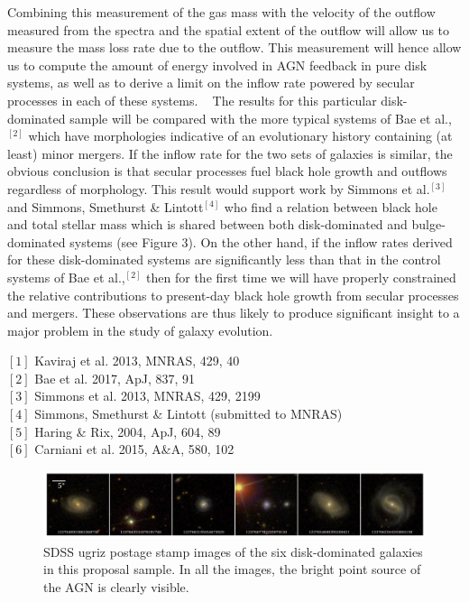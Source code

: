 \documentclass[12pt]{article}
\begin{document}
Combining this measurement of the gas mass with the velocity of the outflow measured from the spectra and the spatial extent of the outflow will allow us to measure the mass loss rate due to the outflow. This measurement will hence allow us to compute the amount of energy involved in AGN feedback in pure disk systems, as well as to derive a limit on the inflow rate powered by secular processes in each of these systems. 
\vspace{0.25em}
 
The results for this particular disk-dominated sample will be compared with the more typical systems of Bae et al.,$^{[2]}$ which have morphologies indicative of an evolutionary history containing (at least) minor mergers. If the inflow rate for the two sets of galaxies is similar, the obvious conclusion is that secular processes fuel black hole growth and outflows regardless of morphology. This result would support work by Simmons et al.$^{[3]}$ and Simmons, Smethurst \& Lintott$^{[4]}$ who find a relation between black hole and total stellar mass which is shared between both disk-dominated and bulge-dominated systems (see Figure 3). On the other hand, if the inflow rates derived for these disk-dominated systems are significantly less than that in the control systems of Bae et al.,$^{[2]}$ then for the first time we will have properly constrained the relative contributions to present-day black hole growth from secular processes and mergers. These observations are thus likely to produce significant insight to a major problem in the study of galaxy evolution. 
\vspace{1.5em}


\vspace{0.5em}


\noindent
$[1]$ Kaviraj et al. 2013, MNRAS, 429, 40
\\
$[2]$ Bae et al. 2017, ApJ, 837, 91
\\
$[3]$ Simmons et al. 2013, MNRAS, 429, 2199 
\\
$[4]$ Simmons, Smethurst \& Lintott (submitted to MNRAS)
\\
$[5]$ Haring \& Rix, 2004, ApJ, 604, 89
\\
$[6]$ Carniani et al. 2015, A\&A, 580, 102

\begin{figure}[h]
\begin{centering}
\includegraphics[width=\textwidth]{mosaic_6_2017B_obs.png}
\caption{SDSS ugriz postage stamp images of the six disk-dominated galaxies in this proposal sample. In all the images, the bright point source of the AGN is clearly visible.}
\end{centering}

\end{figure}
\end{document}
